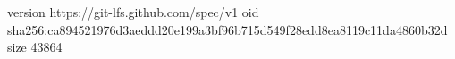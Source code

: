version https://git-lfs.github.com/spec/v1
oid sha256:ca894521976d3aeddd20e199a3bf96b715d549f28edd8ea8119c11da4860b32d
size 43864
